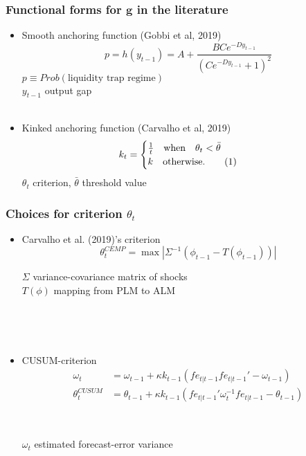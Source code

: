 \documentclass[10pt]{beamer}
\newcommand\numberthis{\addtocounter{equation}{1}\tag{\theequation}} %
\begin{document}
\begin{frame}[plain]  %
	\frametitle{Functional forms for $\mathbf{g}$ in the literature}
	\label{g}
\begin{itemize}
\item Smooth anchoring function (Gobbi et al, 2019)
\begin{equation}
 p = h(y_{t-1}) = A + \frac{B C e^{-D y_{t-1}}}{( C e^{-D y_{t-1}}+1)^2}
\end{equation}
$p \equiv Prob(\text{liquidity trap regime}) $ \\
$y_{t-1}$ output gap \\


\

\item Kinked anchoring function (Carvalho et al, 2019)
 \begin{align*}
k_t & = \begin{cases} \frac{1}{t} \quad \text{when} \quad \theta_t < \bar{\theta}  \\ k \quad \text{otherwise.}\numberthis
\end{cases} 
\end{align*}
$\theta_t$ criterion, $\bar{\theta}$ threshold value

\end{itemize}

\vfill 
\hyperlink{anchoring1}{}	

\end{frame}


\begin{frame}[plain]  %
	\frametitle{Choices for criterion $\theta_t$}
	\label{g}
\begin{itemize}
\item Carvalho et al. (2019)'s criterion  
\begin{equation}
\theta_t^{CEMP} = \max | \Sigma^{-1} ( \phi_{t-1} - T(\phi_{t-1})) |
\end{equation}


$\Sigma$ variance-covariance matrix of shocks \\
$T(\phi)$ mapping from PLM to ALM

\

\

\item CUSUM-criterion
\begin{align}
\omega_t & =  \omega_{t-1} + \kappa k_{t-1}(fe_{t|t-1} fe_{t|t-1}'  -\omega_{t-1})\\
\theta_t^{CUSUM} & =  \theta_{t-1} + \kappa k_{t-1}(fe_{t|t-1}'\omega_t^{-1}fe_{t|t-1} -\theta_{t-1})
\end{align}

\

$\omega_t$ estimated forecast-error variance
\end{itemize}




\vfill

\hyperlink{anchoring1}{}	


\end{frame}
\end{document}
